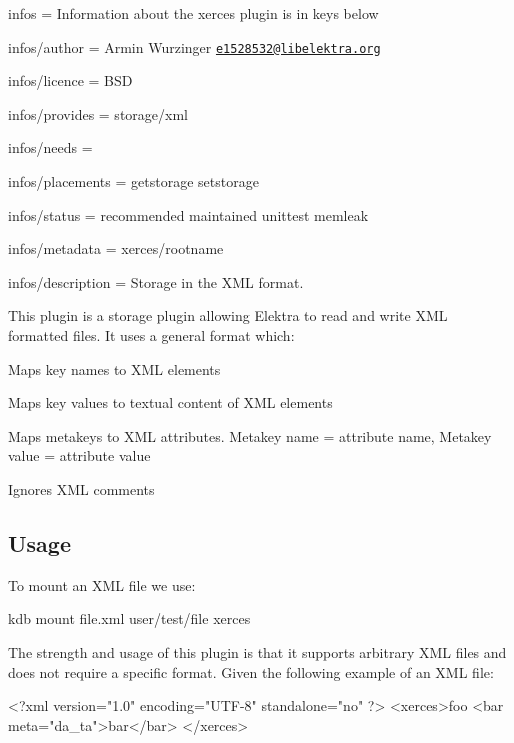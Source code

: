 
\begin{DoxyItemize}
\item infos = Information about the xerces plugin is in keys below
\item infos/author = Armin Wurzinger \href{mailto:e1528532@libelektra.org}{\tt e1528532@libelektra.\+org}
\item infos/licence = B\+SD
\item infos/provides = storage/xml
\item infos/needs =
\item infos/placements = getstorage setstorage
\item infos/status = recommended maintained unittest memleak
\item infos/metadata = xerces/rootname
\item infos/description = Storage in the X\+ML format.
\end{DoxyItemize}

This plugin is a storage plugin allowing Elektra to read and write X\+ML formatted files. It uses a general format which\+:


\begin{DoxyItemize}
\item Maps key names to X\+ML elements
\item Maps key values to textual content of X\+ML elements
\item Maps metakeys to X\+ML attributes. Metakey name = attribute name, Metakey value = attribute value
\item Ignores X\+ML comments
\end{DoxyItemize}

\subsection*{Usage}

To mount an X\+ML file we use\+:


\begin{DoxyCode}
kdb mount file.xml user/test/file xerces
\end{DoxyCode}


The strength and usage of this plugin is that it supports arbitrary X\+ML files and does not require a specific format. Given the following example of an X\+ML file\+:


\begin{DoxyCode}
<?\textcolor{keyword}{xml} \textcolor{keyword}{version}=\textcolor{stringliteral}{"1.0"} \textcolor{keyword}{encoding}=\textcolor{stringliteral}{"UTF-8"} \textcolor{keyword}{standalone}=\textcolor{stringliteral}{"no"} ?>
<\textcolor{keywordtype}{xerces}>\textcolor{keyword}{foo}
  <\textcolor{keywordtype}{bar} \textcolor{keyword}{meta}=\textcolor{stringliteral}{"da\_ta"}>\textcolor{keyword}{bar}</\textcolor{keywordtype}{bar}>
</\textcolor{keywordtype}{xerces}>
\end{DoxyCode}


